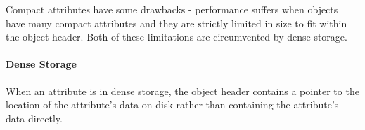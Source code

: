 Compact attributes have some drawbacks - performance suffers when objects have many compact attributes and they are strictly limited in size to fit within the object header.  Both of these limitations are circumvented by dense storage.

\paragraph{Dense Storage} When an attribute is in dense storage, the object header contains a pointer to the location of the attribute's data on disk rather than containing the attribute's data directly.


